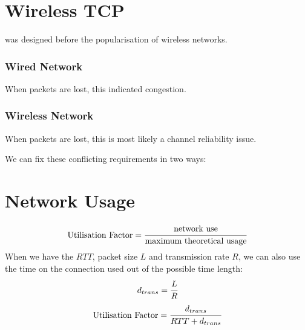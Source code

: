 \documentclass{report}
\begin{document}
\section*{Wireless TCP}
 was designed before the popularisation of wireless networks.
\\ \begin{minipage}{0.47\textwidth}
	\subsubsection*{Wired Network}
	When packets are lost, this indicated congestion.
\end{minipage}
\hfill
\begin{minipage}{0.47\textwidth}
	\subsubsection*{Wireless Network}
	When packets are lost, this is most likely a channel reliability issue.
\end{minipage}
We can fix these conflicting requirements in two ways:

\section*{Network Usage}
\[\text{Utilisation Factor} = \cfrac{\text{network use}}{\text{maximum theoretical usage}}\]
When we have the $RTT$, packet size $L$ and transmission rate $R$, we can also use the time on the connection used out of the possible time length:
\[d_{trans} = \cfrac{L}{R}\]
\[\text{Utilisation Factor} = \cfrac{d_{trans}}{RTT + d_{trans}}\]
\end{document}
